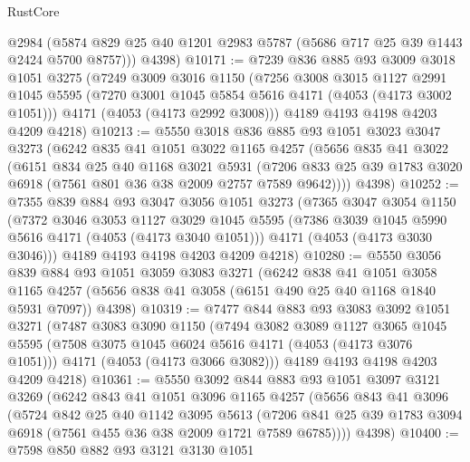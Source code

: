 \begin{lexlean}{RustCore}
\begin{coremodule}
        @2984
        (@5874 @829 @25 @40 @1201 @2983 @5787 (@5686 @717 @25 @39 @1443 @2424 @5700 @8757)))
      @4398)
@10171 := @7239
    @836
    @885
    @93
    @3009
    @3018
    @1051
    @3275
    (@7249
      @3009
      @3016
      @1150
      (@7256
        @3008
        @3015
        @1127
        @2991
        @1045
        @5595
        (@7270 @3001 @1045 @5854 @5616 @4171 (@4053 (@4173 @3002 @1051)))
        @4171
        (@4053 (@4173 @2992 @3008)))
      @4189
      @4193
      @4198
      @4203
      @4209
      @4218)
@10213 := @5550
    @3018
    @836
    @885
    @93
    @1051
    @3023
    @3047
    @3273
    (@6242
      @835
      @41
      @1051
      @3022
      @1165
      @4257
      (@5656
        @835
        @41
        @3022
        (@6151
          @834
          @25
          @40
          @1168
          @3021
          @5931
          (@7206 @833 @25 @39 @1783 @3020 @6918 (@7561 @801 @36 @38 @2009 @2757 @7589 @9642))))
      @4398)
@10252 := @7355
    @839
    @884
    @93
    @3047
    @3056
    @1051
    @3273
    (@7365
      @3047
      @3054
      @1150
      (@7372
        @3046
        @3053
        @1127
        @3029
        @1045
        @5595
        (@7386 @3039 @1045 @5990 @5616 @4171 (@4053 (@4173 @3040 @1051)))
        @4171
        (@4053 (@4173 @3030 @3046)))
      @4189
      @4193
      @4198
      @4203
      @4209
      @4218)
@10280 := @5550
    @3056
    @839
    @884
    @93
    @1051
    @3059
    @3083
    @3271
    (@6242
      @838
      @41
      @1051
      @3058
      @1165
      @4257
      (@5656 @838 @41 @3058 (@6151 @490 @25 @40 @1168 @1840 @5931 @7097))
      @4398)
@10319 := @7477
    @844
    @883
    @93
    @3083
    @3092
    @1051
    @3271
    (@7487
      @3083
      @3090
      @1150
      (@7494
        @3082
        @3089
        @1127
        @3065
        @1045
        @5595
        (@7508 @3075 @1045 @6024 @5616 @4171 (@4053 (@4173 @3076 @1051)))
        @4171
        (@4053 (@4173 @3066 @3082)))
      @4189
      @4193
      @4198
      @4203
      @4209
      @4218)
@10361 := @5550
    @3092
    @844
    @883
    @93
    @1051
    @3097
    @3121
    @3269
    (@6242
      @843
      @41
      @1051
      @3096
      @1165
      @4257
      (@5656
        @843
        @41
        @3096
        (@5724
          @842
          @25
          @40
          @1142
          @3095
          @5613
          (@7206 @841 @25 @39 @1783 @3094 @6918 (@7561 @455 @36 @38 @2009 @1721 @7589 @6785))))
      @4398)
@10400 := @7598
    @850
    @882
    @93
    @3121
    @3130
    @1051

\end{coremodule}
\end{lexlean}
